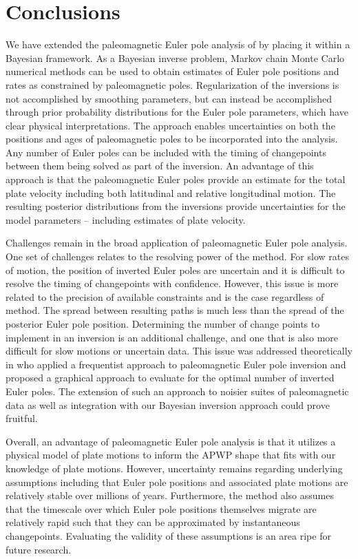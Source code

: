 \documentclass[11pt,letterpaper]{article}
\begin{document}
\section*{Conclusions}
\label{sec:conclusions}

We have extended the paleomagnetic Euler pole analysis of \cite{Gordon1984a} by placing it within a Bayesian framework. As a Bayesian inverse problem, Markov chain Monte Carlo numerical methods can be used to obtain estimates of Euler pole positions and rates as constrained by paleomagnetic poles. Regularization of the inversions is not accomplished by smoothing parameters, but can instead be accomplished through prior probability distributions for the Euler pole parameters, which have clear physical interpretations. The approach enables uncertainties on both the positions and ages of paleomagnetic poles to be incorporated into the analysis. Any number of Euler poles can be included with the timing of changepoints between them being solved as part of the inversion. An advantage of this approach is that the paleomagnetic Euler poles provide an estimate for the total plate velocity including both latitudinal and relative longitudinal motion. The resulting posterior distributions from the inversions provide uncertainties for the model parameters -- including estimates of plate velocity. 

Challenges remain in the broad application of paleomagnetic Euler pole analysis. One set of challenges relates to the resolving power of the method. For slow rates of motion, the position of inverted Euler poles are uncertain and it is difficult to resolve the timing of changepoints with confidence. However, this issue is more related to the precision of available constraints and is the case regardless of method. The spread between resulting paths is much less than the spread of the posterior Euler pole position. Determining the number of change points to implement in an inversion is an additional challenge, and one that is also more difficult for slow motions or uncertain data. This issue was addressed theoretically in \cite{Gallo2021a} who applied a frequentist approach to paleomagnetic Euler pole inversion and proposed a graphical approach to evaluate for the optimal number of inverted Euler poles. The extension of such an approach to noisier suites of paleomagnetic data as well as integration with our Bayesian inversion approach could prove fruitful. 

Overall, an advantage of paleomagnetic Euler pole analysis is that it utilizes a physical model of plate motions to inform the APWP shape that fits with our knowledge of plate motions. However, uncertainty remains regarding underlying assumptions including that Euler pole positions and associated plate motions are relatively stable over millions of years. Furthermore, the method also assumes that the timescale over which Euler pole positions themselves migrate are relatively rapid such that they can be approximated by instantaneous changepoints. Evaluating the validity of these assumptions is an area ripe for future research.    
\end{document}
